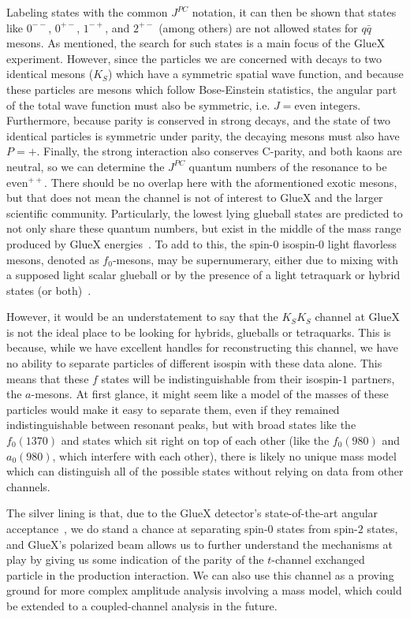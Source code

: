 Labeling states with the common $J^{PC}$ notation, it can then be shown that states like $0^{--}$, $0^{+-}$, $1^{-+}$, and $2^{+-}$ (among others) are not allowed states for $q\bar{q}$ mesons. As mentioned, the search for such states is a main focus of the GlueX experiment. However, since the particles we are concerned with decays to two identical mesons ($K_S$) which have a symmetric spatial wave function, and because these particles are mesons which follow Bose-Einstein statistics, the angular part of the total wave function must also be symmetric, i.e. $J = \text{even integers}$. Furthermore, because parity is conserved in strong decays, and the state of two identical particles is symmetric under parity, the decaying mesons must also have $P=+$. Finally, the strong interaction also conserves C-parity, and both kaons are neutral, so we can determine the $J^{PC}$ quantum numbers of the resonance to be $\text{even}^{++}$. There should be no overlap here with the aformentioned exotic mesons, but that does not mean the channel is not of interest to GlueX and the larger scientific community. Particularly, the lowest lying glueball states are predicted to not only share these quantum numbers, but exist in the middle of the mass range produced by GlueX energies~\cite{Morningstar1999}. To add to this, the spin-$0$ isospin-$0$ light flavorless mesons, denoted as $f_0$-mesons, may be supernumerary, either due to mixing with a supposed light scalar glueball or by the presence of a light tetraquark or hybrid states (or both)~\cite{Zyla2020}.

However, it would be an understatement to say that the $K_SK_S$ channel at GlueX is not the ideal place to be looking for hybrids, glueballs or tetraquarks. This is because, while we have excellent handles for reconstructing this channel, we have no ability to separate particles of different isospin with these data alone. This means that these $f$ states will be indistinguishable from their isospin-$1$ partners, the $a$-mesons. At first glance, it might seem like a model of the masses of these particles would make it easy to separate them, even if they remained indistinguishable between resonant peaks, but with broad states like the $f_0(1370)$ and states which sit right on top of each other (like the $f_0(980)$ and $a_0(980)$, which interfere with each other), there is likely no unique mass model which can distinguish all of the possible states without relying on data from other channels.

The silver lining is that, due to the GlueX detector's state-of-the-art angular acceptance~\cite{Adhikari2021}, we do stand a chance at separating spin-$0$ states from spin-$2$ states, and GlueX's polarized beam allows us to further understand the mechanisms at play by giving us some indication of the parity of the $t$-channel exchanged particle in the production interaction. We can also use this channel as a proving ground for more complex amplitude analysis involving a mass model, which could be extended to a coupled-channel analysis in the future.


